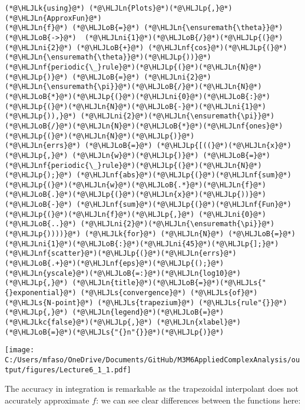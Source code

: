 \documentclass[12pt,a4paper]{article}
\newcommand{\HLJLk}[1]{\textcolor[RGB]{148,91,176}{\textbf{#1}}}
\newcommand{\HLJLkc}[1]{\textcolor[RGB]{59,151,46}{\textit{#1}}}
\newcommand{\HLJLn}[1]{#1}
\newcommand{\HLJLnf}[1]{\textcolor[RGB]{66,102,213}{#1}}
\newcommand{\HLJLs}[1]{\textcolor[RGB]{201,61,57}{#1}}
\newcommand{\HLJLni}[1]{\textcolor[RGB]{59,151,46}{#1}}
\newcommand{\HLJLoB}[1]{\textcolor[RGB]{102,102,102}{\textbf{#1}}}
\newcommand{\HLJLp}[1]{#1}
\begin{document}
\begin{lstlisting}
(*@\HLJLk{using}@*) (*@\HLJLn{Plots}@*)(*@\HLJLp{,}@*) (*@\HLJLn{ApproxFun}@*)
(*@\HLJLn{f}@*) (*@\HLJLoB{=}@*) (*@\HLJLn{\ensuremath{\theta}}@*) (*@\HLJLoB{->}@*)  (*@\HLJLni{1}@*)(*@\HLJLoB{/}@*)(*@\HLJLp{(}@*)(*@\HLJLni{2}@*) (*@\HLJLoB{+}@*) (*@\HLJLnf{cos}@*)(*@\HLJLp{(}@*)(*@\HLJLn{\ensuremath{\theta}}@*)(*@\HLJLp{))}@*)
(*@\HLJLnf{periodic{\_}rule}@*)(*@\HLJLp{(}@*)(*@\HLJLn{N}@*)(*@\HLJLp{)}@*) (*@\HLJLoB{=}@*) (*@\HLJLni{2}@*)(*@\HLJLn{\ensuremath{\pi}}@*)(*@\HLJLoB{/}@*)(*@\HLJLn{N}@*)(*@\HLJLoB{*}@*)(*@\HLJLp{(}@*)(*@\HLJLni{0}@*)(*@\HLJLoB{:}@*)(*@\HLJLp{(}@*)(*@\HLJLn{N}@*)(*@\HLJLoB{-}@*)(*@\HLJLni{1}@*)(*@\HLJLp{)),}@*) (*@\HLJLni{2}@*)(*@\HLJLn{\ensuremath{\pi}}@*)(*@\HLJLoB{/}@*)(*@\HLJLn{N}@*)(*@\HLJLoB{*}@*)(*@\HLJLnf{ones}@*)(*@\HLJLp{(}@*)(*@\HLJLn{N}@*)(*@\HLJLp{)}@*)
(*@\HLJLn{errs}@*) (*@\HLJLoB{=}@*) (*@\HLJLp{[((}@*)(*@\HLJLn{x}@*)(*@\HLJLp{,}@*) (*@\HLJLn{w}@*)(*@\HLJLp{)}@*) (*@\HLJLoB{=}@*) (*@\HLJLnf{periodic{\_}rule}@*)(*@\HLJLp{(}@*)(*@\HLJLn{N}@*)(*@\HLJLp{);}@*) (*@\HLJLnf{abs}@*)(*@\HLJLp{(}@*)(*@\HLJLnf{sum}@*)(*@\HLJLp{(}@*)(*@\HLJLn{w}@*)(*@\HLJLoB{.*}@*)(*@\HLJLn{f}@*)(*@\HLJLoB{.}@*)(*@\HLJLp{(}@*)(*@\HLJLn{x}@*)(*@\HLJLp{))}@*) (*@\HLJLoB{-}@*) (*@\HLJLnf{sum}@*)(*@\HLJLp{(}@*)(*@\HLJLnf{Fun}@*)(*@\HLJLp{(}@*)(*@\HLJLn{f}@*)(*@\HLJLp{,}@*) (*@\HLJLni{0}@*) (*@\HLJLoB{..}@*) (*@\HLJLni{2}@*)(*@\HLJLn{\ensuremath{\pi}}@*)(*@\HLJLp{))))}@*) (*@\HLJLk{for}@*) (*@\HLJLn{N}@*) (*@\HLJLoB{=}@*) (*@\HLJLni{1}@*)(*@\HLJLoB{:}@*)(*@\HLJLni{45}@*)(*@\HLJLp{];}@*)
(*@\HLJLnf{scatter}@*)(*@\HLJLp{(}@*)(*@\HLJLn{errs}@*)(*@\HLJLoB{.+}@*)(*@\HLJLnf{eps}@*)(*@\HLJLp{();}@*) (*@\HLJLn{yscale}@*)(*@\HLJLoB{=:}@*)(*@\HLJLn{log10}@*)(*@\HLJLp{,}@*) (*@\HLJLn{title}@*)(*@\HLJLoB{=}@*)(*@\HLJLs{"{}exponential}@*) (*@\HLJLs{convergence}@*) (*@\HLJLs{of}@*) (*@\HLJLs{N-point}@*) (*@\HLJLs{trapezium}@*) (*@\HLJLs{rule"{}}@*)(*@\HLJLp{,}@*) (*@\HLJLn{legend}@*)(*@\HLJLoB{=}@*)(*@\HLJLkc{false}@*)(*@\HLJLp{,}@*) (*@\HLJLn{xlabel}@*)(*@\HLJLoB{=}@*)(*@\HLJLs{"{}n"{}}@*)(*@\HLJLp{)}@*)
\end{lstlisting}

\texttt{[image: C:/Users/mfaso/OneDrive/Documents/GitHub/M3M6AppliedComplexAnalysis/output/figures/Lecture6\_1\_1.pdf]}

The accuracy in integration is remarkable as the trapezoidal interpolant does not accurately approximate $f$: we can see clear differences between the functions here:
\end{document}
